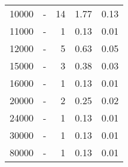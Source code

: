 \begin{longtable}{lXrrr}
        10000 & \multicolumn{1}{X}{-} & %
          \num{14} &
          \num[round-mode=places,round-precision=2]{1.77} &
          \num[round-mode=places,round-precision=2]{0.13} \\

        11000 & \multicolumn{1}{X}{-} & %
          \num{1} &
          \num[round-mode=places,round-precision=2]{0.13} &
          \num[round-mode=places,round-precision=2]{0.01} \\

        12000 & \multicolumn{1}{X}{-} & %
          \num{5} &
          \num[round-mode=places,round-precision=2]{0.63} &
          \num[round-mode=places,round-precision=2]{0.05} \\

        15000 & \multicolumn{1}{X}{-} & %
          \num{3} &
          \num[round-mode=places,round-precision=2]{0.38} &
          \num[round-mode=places,round-precision=2]{0.03} \\

        16000 & \multicolumn{1}{X}{-} & %
          \num{1} &
          \num[round-mode=places,round-precision=2]{0.13} &
          \num[round-mode=places,round-precision=2]{0.01} \\

        20000 & \multicolumn{1}{X}{-} & %
          \num{2} &
          \num[round-mode=places,round-precision=2]{0.25} &
          \num[round-mode=places,round-precision=2]{0.02} \\

        24000 & \multicolumn{1}{X}{-} & %
          \num{1} &
          \num[round-mode=places,round-precision=2]{0.13} &
          \num[round-mode=places,round-precision=2]{0.01} \\

        30000 & \multicolumn{1}{X}{-} & %
          \num{1} &
          \num[round-mode=places,round-precision=2]{0.13} &
          \num[round-mode=places,round-precision=2]{0.01} \\

        80000 & \multicolumn{1}{X}{-} & %
          \num{1} &
          \num[round-mode=places,round-precision=2]{0.13} &
          \num[round-mode=places,round-precision=2]{0.01} \\


\end{longtable}
